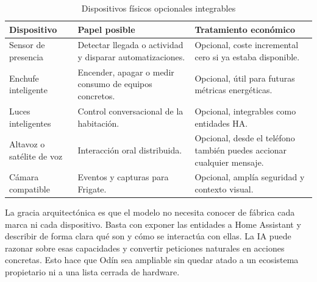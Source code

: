 \begin{table}[H]
  \centering
  \caption{Dispositivos físicos opcionales integrables}
  \label{tab:dispositivos-opcionales}
  \begin{tabularx}{\textwidth}{lXX}
    \toprule
    Dispositivo & Papel posible & Tratamiento económico \\
    \midrule
    Sensor de presencia & Detectar llegada o actividad y disparar automatizaciones. & Opcional, coste incremental cero si ya estaba disponible. \\
    Enchufe inteligente & Encender, apagar o medir consumo de equipos concretos. & Opcional, útil para futuras métricas energéticas. \\
    Luces inteligentes & Control conversacional de la habitación. & Opcional, integrables como entidades HA. \\
    Altavoz o satélite de voz & Interacción oral distribuida. & Opcional, desde el teléfono también puedes accionar cualquier mensaje. \\
    Cámara compatible & Eventos y capturas para Frigate. & Opcional, amplía seguridad y contexto visual. \\
    \bottomrule
  \end{tabularx}
\end{table}

La gracia arquitectónica es que el modelo no necesita conocer de fábrica cada marca ni cada dispositivo. Basta con exponer las entidades a Home Assistant y describir de forma clara qué son y cómo se interactúa con ellas. La IA puede razonar sobre esas capacidades y convertir peticiones naturales en acciones concretas. Esto hace que Odín sea ampliable sin quedar atado a un ecosistema propietario ni a una lista cerrada de hardware.
